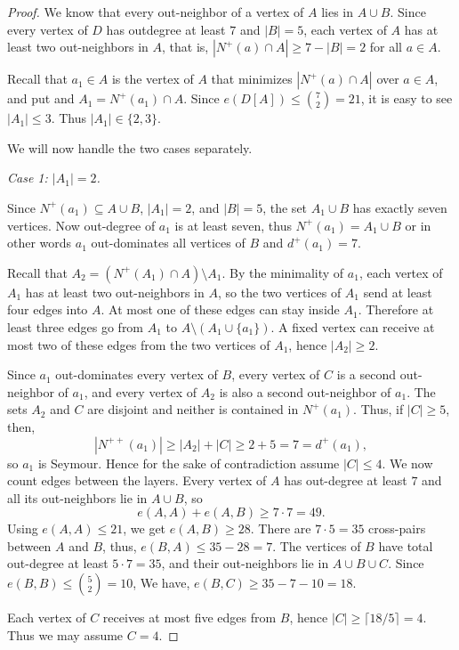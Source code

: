 \documentclass[a4paper,fleqn]{cas-sc}
\theoremstyle{definition}
\begin{document}
\begin{proof}
We know that every out-neighbor of a vertex of $A$ lies in $A\cup B$. Since every vertex of $D$ has outdegree at least $7$ and $|B|=5$, each vertex of $A$ has at least two out-neighbors in $A$, that is, $|N^+(a)\cap A|\ge 7-|B|=2$ for all $a\in A$.

Recall that $a_1\in A$ is the vertex of $A$ that minimizes $|N^+(a)\cap A|$ over $a\in A$, and put and $A_1=N^+(a_1)\cap A$.
Since $e(D[A])\leq \binom{7}{2}=21$, it is easy to see $|A_1|\leq 3$. Thus $|A_1|\in\{2,3\}$.

We will now handle the two cases separately.

\medskip
\noindent\emph{Case 1: $|A_1|=2$.}


Since $N^+(a_1)\subseteq A\cup B$, $|A_1|=2$, and $|B|=5$, the set $A_1\cup B$ has exactly seven vertices. Now out-degree of $a_1$ is at least seven, thus $N^+(a_1)=A_1\cup B$ or in other words $a_1$ out-dominates all vertices of $B$ and $d^+(a_1)=7$.

Recall that $A_2=(N^+(A_1)\cap A)\setminus A_1.$ By the minimality of $a_1$, each vertex of $A_1$ has at least two out-neighbors in $A$, so the two vertices of $A_1$ send at least four edges into $A$. At most one of these edges can stay inside $A_1$. Therefore at least three edges go from $A_1$ to $A\setminus (A_1\cup\{a_1\})$. A fixed vertex can receive at most two of these edges from the two vertices of $A_1$, hence $|A_2|\geq 2$.


Since $a_1$ out-dominates every vertex of $B$, every vertex of $C$ is a second out-neighbor of $a_1$, and every vertex of $A_2$ is also a second out-neighbor of $a_1$. The sets $A_2$ and $C$ are disjoint and neither is contained in $N^+(a_1)$. Thus, if $|C|\ge 5$, then,
\[
|N^{++}(a_1)|\ge |A_2|+|C|\ge 2+5=7=d^+(a_1),
\]
so $a_1$ is Seymour. Hence for the sake of contradiction assume $ |C|\le 4.$
We now count edges between the layers. Every vertex of $A$ has out-degree at least $7$ and all its out-neighbors lie in $A\cup B$, so
\[
e(A,A)+e(A,B)\ge 7\cdot 7=49.
\]
Using $e(A,A)\le 21$, we get $e(A,B)\ge 28.$ There are $7\cdot 5=35$ cross-pairs between $A$ and $B$, thus, $e(B,A)\le 35-28=7.$
The vertices of $B$ have total out-degree at least $5\cdot 7=35$, and their out-neighbors lie in $A\cup B\cup C$. Since $e(B,B)\le \binom{5}{2}=10$, We have,
$e(B,C)\ge 35-7-10=18$.

Each vertex of $C$ receives at most five edges from $B$, hence $|C|\ge \lceil 18/5\rceil=4$. Thus we may assume $C=4$.






\end{proof}
\end{document}

